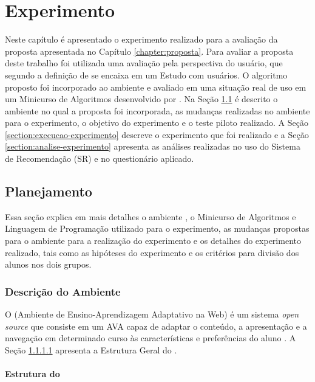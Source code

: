 \chapter{Experimento}\label{chapter:experimento}

Neste capítulo é apresentado o experimento realizado para a avaliação da proposta apresentada no Capítulo \ref{chapter:proposta}.
Para avaliar a proposta deste trabalho foi utilizada uma avaliação pela perspectiva do usuário, que segundo a definição de
 se encaixa em um Estudo com usuários. O algoritmo proposto foi incorporado ao ambiente
\adaptwebspace e avaliado em uma situação real de uso em um Minicurso de Algoritmos desenvolvido por .
Na Seção \ref{section:planejamento-experimento} é descrito o ambiente \adaptwebspace no qual a proposta foi incorporada,
as mudanças realizadas no ambiente para o experimento, o objetivo do experimento e o teste piloto realizado. A Seção
\ref{section:execucao-experimento} descreve o experimento que foi realizado e a Seção \ref{section:analise-experimento} apresenta
as análises realizadas no uso do Sistema de Recomendação (SR) e no questionário aplicado.

\section{Planejamento}\label{section:planejamento-experimento}

Essa seção explica em mais detalhes o ambiente \adaptweb, o Minicurso de Algoritmos e Linguagem de Programação utilizado
para o experimento, as mudanças propostas para o ambiente para a realização do experimento e os detalhes do experimento
realizado, tais como as hipóteses do experimento e os critérios para divisão dos alunos nos dois grupos.

\subsection{Descrição do Ambiente \adaptweb}

O \adaptwebspace (Ambiente de Ensino-Aprendizagem Adaptativo na Web) é um sistema \textit{open source}
que consiste em um AVA capaz de adaptar o conteúdo, a apresentação e a navegação em determinado curso às características
e preferências do aluno \cite{gasparini2009adaptweb}. A Seção \ref{subsection:estrutura-adaptweb} apresenta a Estrutura Geral do
\adaptweb.

\subsubsection{Estrutura do \adaptweb}\label{subsection:estrutura-adaptweb}

